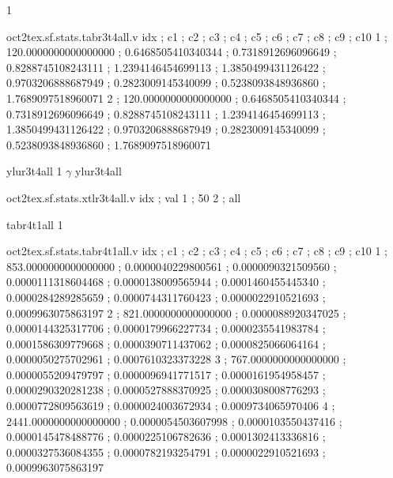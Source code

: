 \expandafter\def\csname oct2tex.sf.stats.tabr3t4all.u\endcsname{1}
\begin{filecontents}[overwrite]{oct2tex.sf.stats.tabr3t4all.v}
idx ; c1 ; c2 ; c3 ; c4 ; c5 ; c6 ; c7 ; c8 ; c9 ; c10
1 ; 120.0000000000000000 ; 0.6468505410340344 ; 0.7318912696096649 ; 0.8288745108243111 ; 1.2394146454699113 ; 1.3850499431126422 ; 0.9703206888687949 ; 0.2823009145340099 ; 0.5238093848936860 ; 1.7689097518960071
2 ; 120.0000000000000000 ; 0.6468505410340344 ; 0.7318912696096649 ; 0.8288745108243111 ; 1.2394146454699113 ; 1.3850499431126422 ; 0.9703206888687949 ; 0.2823009145340099 ; 0.5238093848936860 ; 1.7689097518960071
\end{filecontents}
\expandafter\def\csname oct2tex.sf.stats.ylur3t4all.t\endcsname{ylur3t4all}
\expandafter\def\csname oct2tex.sf.stats.ylur3t4all.u\endcsname{1}
\expandafter\def\csname oct2tex.sf.stats.ylur3t4all.v\endcsname{$\gamma$}
\expandafter\def\csname oct2tex.sf.stats.xtlr3t4all.t\endcsname{ylur3t4all}
\begin{filecontents}[overwrite]{oct2tex.sf.stats.xtlr3t4all.v}
idx ; val
1 ; 50
2 ; all
\end{filecontents}
\expandafter\def\csname oct2tex.sf.stats.tabr4t1all.t\endcsname{tabr4t1all}
\expandafter\def\csname oct2tex.sf.stats.tabr4t1all.u\endcsname{1}
\begin{filecontents}[overwrite]{oct2tex.sf.stats.tabr4t1all.v}
idx ; c1 ; c2 ; c3 ; c4 ; c5 ; c6 ; c7 ; c8 ; c9 ; c10
1 ; 853.0000000000000000 ; 0.0000040229800561 ; 0.0000090321509560 ; 0.0000111318604468 ; 0.0000138009565944 ; 0.0001460455445340 ; 0.0000284289285659 ; 0.0000744311760423 ; 0.0000022910521693 ; 0.0009963075863197
2 ; 821.0000000000000000 ; 0.0000088920347025 ; 0.0000144325317706 ; 0.0000179966227734 ; 0.0000235541983784 ; 0.0001586309779668 ; 0.0000390711437062 ; 0.0000825066064164 ; 0.0000050275702961 ; 0.0007610323373228
3 ; 767.0000000000000000 ; 0.0000055209479797 ; 0.0000096941771517 ; 0.0000161954958457 ; 0.0000290320281238 ; 0.0000527888370925 ; 0.0000308008776293 ; 0.0000772809563619 ; 0.0000024003672934 ; 0.0009734065970406
4 ; 2441.0000000000000000 ; 0.0000054503607998 ; 0.0000103550437416 ; 0.0000145478488776 ; 0.0000225106782636 ; 0.0001302413336816 ; 0.0000327536084355 ; 0.0000782193254791 ; 0.0000022910521693 ; 0.0009963075863197
\end{filecontents}

